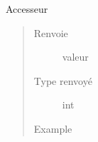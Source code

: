 \documentclass[letterpaper,10pt,french]{sphinxmanual}
\begin{document}
\begin{fulllineitems}
\begin{fulllineitems}
\label{\detokenize{parsertokens:parsertokens.TokenNumber.value}}
Accesseur
\begin{quote}\begin{description}
\item[{Renvoie}] \leavevmode
valeur

\item[{Type renvoyé}] \leavevmode
int

\item[{Example}] \leavevmode
\begin{sphinxVerbatim}[commandchars=\\\{\}]
\end{sphinxVerbatim}

\end{description}\end{quote}

\end{fulllineitems}


\end{fulllineitems}

\end{document}

